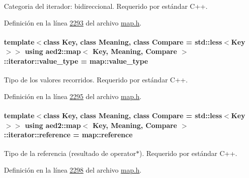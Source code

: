 Categoria del iterador\-: bidireccional. Requerido por estándar C++. 



Definición en la línea \hyperlink{map_8h_source_l02293}{2293} del archivo \hyperlink{map_8h_source}{map.\-h}.

\hypertarget{classaed2_1_1map_1_1iterator_a4e1d954ef5c6a64bbcd881854f039a16_a4e1d954ef5c6a64bbcd881854f039a16}{
\paragraph[{value\-\_\-type}]{\setlength{\rightskip}{0pt plus 5cm}template$<$class Key, class Meaning, class Compare = std\-::less$<$\-Key$>$$>$ using {\bf aed2\-::map}$<$ Key, Meaning, Compare $>$\-::{\bf iterator\-::value\-\_\-type} =  {\bf map\-::value\-\_\-type}}}\label{classaed2_1_1map_1_1iterator_a4e1d954ef5c6a64bbcd881854f039a16_a4e1d954ef5c6a64bbcd881854f039a16}


Tipo de los valores recorridos. Requerido por estándar C++. 



Definición en la línea \hyperlink{map_8h_source_l02295}{2295} del archivo \hyperlink{map_8h_source}{map.\-h}.

\hypertarget{classaed2_1_1map_1_1iterator_ac19788914a3110897e44c53f1318f6af_ac19788914a3110897e44c53f1318f6af}{
\paragraph[{reference}]{\setlength{\rightskip}{0pt plus 5cm}template$<$class Key, class Meaning, class Compare = std\-::less$<$\-Key$>$$>$ using {\bf aed2\-::map}$<$ Key, Meaning, Compare $>$\-::{\bf iterator\-::reference} =  {\bf map\-::reference}}}\label{classaed2_1_1map_1_1iterator_ac19788914a3110897e44c53f1318f6af_ac19788914a3110897e44c53f1318f6af}


Tipo de la referencia (resultado de operator$\ast$). Requerido por estándar C++. 



Definición en la línea \hyperlink{map_8h_source_l02298}{2298} del archivo \hyperlink{map_8h_source}{map.\-h}.

